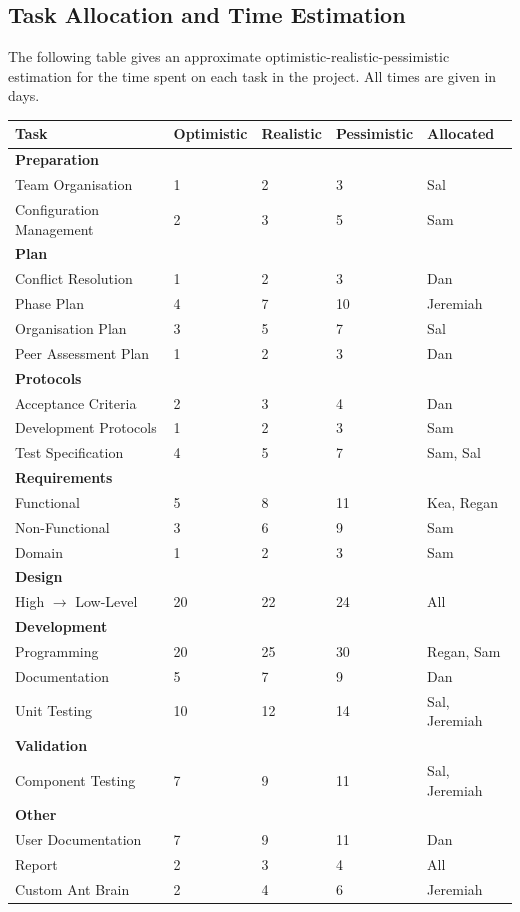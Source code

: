 \documentclass[11pt]{article}
\begin{document}
\subsection{Task Allocation and Time Estimation}

The following table gives an approximate optimistic-realistic-pessimistic estimation for the time spent on each task in the project. All times are given in days.

\begin{center}
\begin{tabular}{|l|l|l|l|l|}
\hline
\textbf{Task} & \textbf{Optimistic} & \textbf{Realistic} & \textbf{Pessimistic} & \textbf{Allocated}  \\ \hline
\multicolumn{5}{|l|}{\textbf{Preparation}} \\ \hline
Team Organisation & 1 & 2 & 3 & Sal \\ \hline
Configuration Management & 2 & 3 & 5 & Sam \\ \hline
\multicolumn{5}{|l|}{\textbf{Plan}} \\ \hline
Conflict Resolution & 1 & 2 & 3 & Dan \\ \hline
Phase Plan & 4 & 7 & 10 & Jeremiah \\ \hline
Organisation Plan & 3 & 5 & 7 & Sal\\ \hline
Peer Assessment Plan & 1 & 2 & 3 & Dan \\ \hline
\multicolumn{5}{|l|}{\textbf{Protocols}} \\ \hline
Acceptance Criteria & 2 & 3 & 4 & Dan \\ \hline
Development Protocols & 1 & 2 & 3 & Sam \\ \hline
Test Specification & 4 & 5 & 7 & Sam, Sal \\ \hline
\multicolumn{5}{|l|}{\textbf{Requirements}} \\ \hline
Functional & 5 & 8 & 11 & Kea, Regan \\ \hline
Non-Functional & 3 & 6 & 9 & Sam \\ \hline
Domain & 1 & 2 & 3 & Sam \\ \hline
\multicolumn{5}{|l|}{\textbf{Design}} \\ \hline
High $\rightarrow$ Low-Level & 20 & 22 & 24 & All \\ \hline
\multicolumn{5}{|l|}{\textbf{Development}} \\ \hline
Programming & 20 & 25 & 30 & Regan, Sam \\ \hline
Documentation & 5 & 7 & 9 & Dan \\ \hline
Unit Testing & 10 & 12 & 14 & Sal, Jeremiah \\ \hline
\multicolumn{5}{|l|}{\textbf{Validation}} \\ \hline
Component Testing & 7 & 9 & 11 & Sal, Jeremiah \\ \hline
\multicolumn{5}{|l|}{\textbf{Other}} \\ \hline
User Documentation & 7 & 9 & 11 & Dan \\ \hline
Report & 2 & 3 & 4 & All \\ \hline
Custom Ant Brain & 2 & 4 & 6 & Jeremiah \\ \hline
\end{tabular}
\end{center}
\end{document}
